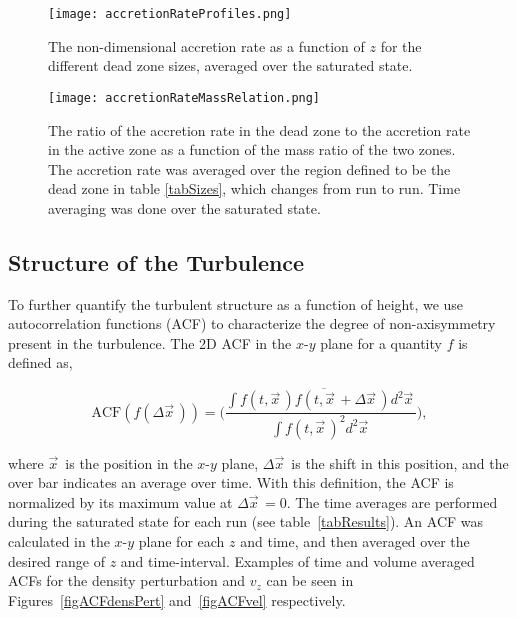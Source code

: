 \begin{figure}[p]
\centering
\texttt{[image: accretionRateProfiles.png]}
\caption{The non-dimensional accretion rate as a function of $z$ for the different dead zone sizes, averaged over the saturated state.}
\label{figAccretionProfiles}
\end{figure}

\begin{figure}[p]
\centering
\texttt{[image: accretionRateMassRelation.png]}
\caption{The ratio of the accretion rate in the dead zone to the accretion rate in the active zone as a function of the mass ratio of the two zones.  The accretion rate was averaged over the region defined to be the dead zone in table \ref{tabSizes}, which changes from run to run.  Time averaging was done over the saturated state.  }
\label{figAccretionMassRelation}
\end{figure}


\subsection{Structure of the Turbulence}
To further quantify the turbulent structure as a function of height, we use autocorrelation functions (ACF) to 
characterize the degree of non-axisymmetry present in the turbulence. The 2D ACF in the $x$-$y$ plane for a quantity $f$ is defined as,

\begin{equation}
\text{ACF}(f(\Delta \vec{x}^{\,})) = \overline{ \bigg( \frac{\int f(t ,\vec{x}^{\,}) f(t ,\vec{x}^{\,} + \Delta \vec{x}^{\,}) d^2 \vec{x}^{\,}}{\int f(t ,\vec{x}^{\,})^2 d^2 \vec{x}^{\,}} \bigg) , }                     
\end{equation} 

\noindent where $\vec{x}^{\,}$ is the position in the $x$-$y$ plane, $\Delta \vec{x}^{\,}$ is the shift in this position, and the over bar indicates an average over time.  With this definition, the ACF is normalized by its maximum value at $\Delta \vec{x}^{\,}=0$.  The time averages are performed during the saturated state for each run (see table~\ref{tabResults}).  An ACF was calculated in the $x$-$y$ plane for each $z$ and time, and then averaged over the desired range of $z$ and time-interval.  Examples of time and volume averaged ACFs for the density perturbation and $v_z$ can be seen in Figures~\ref{figACFdensPert} and~\ref{figACFvel} respectively.

